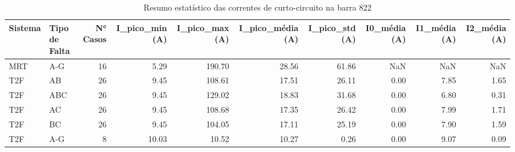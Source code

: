 \begin{table}[htbp]
\centering
\caption{Resumo estatístico das correntes de curto-circuito na barra 822}
\label{tab:resumo_geral_cap4}
\begin{tabular}{llrrrrrrrr}
\toprule
Sistema & Tipo de Falta & N° Casos & I_pico_min (A) & I_pico_max (A) & I_pico_média (A) & I_pico_std (A) & I0_média (A) & I1_média (A) & I2_média (A) \\
\midrule
MRT & A-G & 16 & 5.29 & 190.70 & 28.56 & 61.86 & NaN & NaN & NaN \\
T2F & AB & 26 & 9.45 & 108.61 & 17.51 & 26.11 & 0.00 & 7.85 & 1.65 \\
T2F & ABC & 26 & 9.45 & 129.02 & 18.83 & 31.68 & 0.00 & 6.80 & 0.31 \\
T2F & AC & 26 & 9.45 & 108.68 & 17.35 & 26.42 & 0.00 & 7.99 & 1.71 \\
T2F & BC & 26 & 9.45 & 104.05 & 17.11 & 25.19 & 0.00 & 7.90 & 1.59 \\
T2F & A-G & 8 & 10.03 & 10.52 & 10.27 & 0.26 & 0.00 & 9.07 & 0.09 \\
\bottomrule
\end{tabular}
\end{table}
